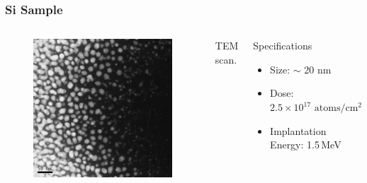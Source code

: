 \documentclass{beamer}
\begin{document}
\begin{frame}
\frametitle{Si Sample}
\begin{columns}
\begin{figure}
\centering
\includegraphics[width=\textwidth]{tem_si}
\end{figure}
\begin{center}
TEM scan.
\end{center}
\begin{block}{Specifications}
\begin{itemize}
\item Size: $\sim$ 20 nm
\item Dose: $2.5\times 10^{17}\,\,\text{atoms}/\text{cm}^{2}$
\item Implantation Energy: 1.5\,MeV
\end{itemize}
\end{block}
\end{columns}
\end{frame}
\end{document}
